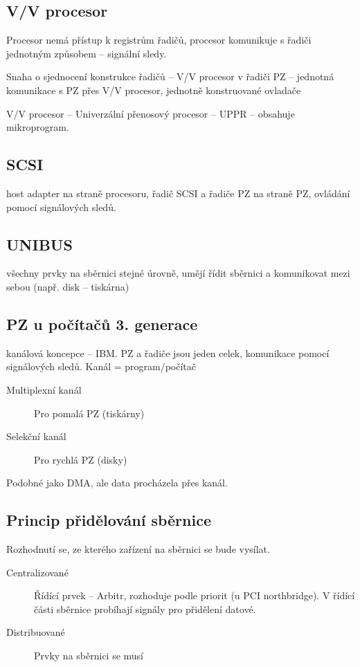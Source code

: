 \documentclass[a4paper, 11pt]{report}
\begin{document}
\subsection{V/V procesor}

Procesor nemá přístup k registrům řadičů, procesor komunikuje s řadiči jednotným způsobem -- signální sledy.

Snaha o sjednocení konstrukce řadičů -- V/V procesor v řadiči PZ -- jednotná komunikace s PZ přes V/V procesor, jednotně konstruované ovladače

V/V procesor -- Univerzální přenosový procesor -- UPPR -- obsahuje mikroprogram.

\subsection{SCSI}
host adapter na straně procesoru, řadič SCSI a řadiče PZ na straně PZ, ovládání pomocí signálových sledů.

\subsection{UNIBUS}
všechny prvky na sběrnici stejné úrovně, umějí řídit sběrnici a komunikovat mezi sebou (např. disk -- tiskárna)

\subsection{PZ u počítačů 3. generace}
kanálová koncepce -- IBM. PZ a řadiče jsou jeden celek, komunikace pomocí signálových sledů. Kanál = program/počítač

\begin{description}
	\item[Multiplexní kanál] Pro pomalá PZ (tiskárny)
	\item[Selekční kanál] Pro rychlá PZ (disky)
\end{description}

Podobné jako DMA, ale data procházela přes kanál.

\subsection{Princip přidělování sběrnice}

Rozhodnutí se, ze kterého zařízení na sběrnici se bude vysílat.

\begin{description}
	\item[Centralizované] Řídící prvek -- Arbitr, rozhoduje podle priorit (u PCI northbridge). V řídící části sběrnice probíhají signály pro přidělení datové.
	\item[Distribuované] Prvky na sběrnici se musí 
\end{description}
\end{document}
